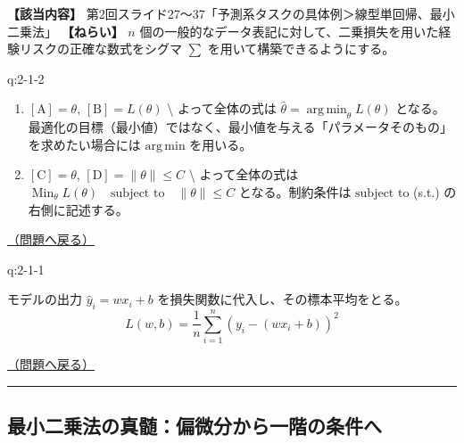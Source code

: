 \textbf{【該当内容】}
第2回スライド27〜37「予測系タスクの具体例＞線型単回帰、最小二乗法」
\textbf{【ねらい】} \(n\)
個の一般的なデータ表記に対して、二乗損失を用いた経験リスクの正確な数式をシグマ
\(\sum\) を用いて構築できるようにする。

\begin{answerbox}[phantomlabel=a:2-1-2]{q:2-1-2}

\begin{enumerate}
\def\labelenumi{\arabic{enumi}.}
\tightlist
\item
  \([\text{A}] = \theta\), \quad \([\text{B}] = L(\theta)\)
  \textbackslash{} よって全体の式は
  \(\hat{\theta} = \mathop{\mathrm{arg\,min}}_{\theta} L(\theta)\)
  となる。最適化の目標（最小値）ではなく、最小値を与える「パラメータそのもの」を求めたい場合には
  \(\mathrm{arg\,min}\) を用いる。
\item
  \([\text{C}] = \theta\), \quad \([\text{D}] = \|\theta\| \le C\)
  \textbackslash{} よって全体の式は
  \(\mathop{\mathrm{Min}}_{\theta} L(\theta) \quad \text{subject to} \quad \|\theta\| \le C\)
  となる。制約条件は \(\text{subject to}\) (s.t.) の右側に記述する。
\end{enumerate}

\hfill 

\hyperref[q:2-1-2]{（問題へ戻る）}

\end{answerbox}

\begin{answerbox}[phantomlabel=a:2-1-1]{q:2-1-1}

モデルの出力 \(\hat{y}_i = wx_i + b\)
を損失関数に代入し、その標本平均をとる。 \[
L(w,b) = \frac{1}{n} \sum_{i=1}^n (y_i - (wx_i + b))^2
\]

\hfill 

\hyperref[q:2-1-1]{（問題へ戻る）}

\begin{center}\rule{0.5\linewidth}{0.5pt}\end{center}

\end{answerbox}

\subsection{最小二乗法の真髄：偏微分から一階の条件へ}\label{ux6700ux5c0fux4e8cux4e57ux6cd5ux306eux771fux9ac4ux504fux5faeux5206ux304bux3089ux4e00ux968eux306eux6761ux4ef6ux3078}

